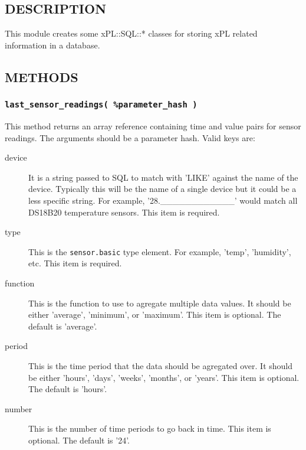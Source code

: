 \documentclass[12pt,a4paper]{article}
\begin{document}
\subsection*{DESCRIPTION\label{xPL::SQL_DESCRIPTION}}


This module creates some xPL::SQL::* classes for storing xPL related
information in a database.

\subsection*{METHODS\label{xPL::SQL_METHODS}}
\subsubsection*{\texttt{last\_sensor\_readings( \%parameter\_hash )}\label{xPL::SQL_last_sensor_readings_parameter_hash_}}


This method returns an array reference containing time and value pairs for
sensor readings.  The arguments should be a parameter hash.  Valid keys
are:

\begin{description}

\item[{device}] \mbox{}

It is a string passed to SQL to match with 'LIKE' against the name of
the device.  Typically this will be the name of a single device but it
could be a less specific string.  For example, '28.\_\_\_\_\_\_\_\_\_\_\_\_' would
match all DS18B20 temperature sensors.  This item is required.


\item[{type}] \mbox{}

This is the \texttt{sensor.basic} type element.  For example, 'temp',
'humidity', etc.  This item is required.


\item[{function}] \mbox{}

This is the function to use to agregate multiple data values.  It
should be either 'average', 'minimum', or 'maximum'.  This item is
optional.  The default is 'average'.


\item[{period}] \mbox{}

This is the time period that the data should be agregated over.  It
should be either 'hours', 'days', 'weeks', 'months', or 'years'.  This
item is optional.  The default is 'hours'.


\item[{number}] \mbox{}

This is the number of time periods to go back in time.  This item is
optional.  The default is '24'.

\end{description}
\end{document}
